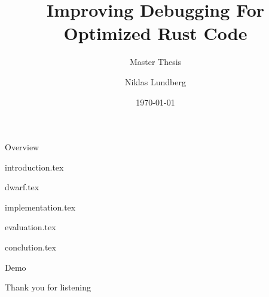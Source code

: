 \documentclass[aspectratio=169,xcolor=dvipsnames]{beamer}
\title[short title]{Improving Debugging For Optimized Rust Code}
\subtitle{Master Thesis}
\author[Niklas] {Niklas Lundberg}
\institute[LTU] %
{
    Department of Computer Science, Electrical and Space Engineering \\
    Luleå University of Technology
    \vskip 3pt
}
\date{\today} %
\begin{document}
\begin{frame}
    \titlepage
\end{frame}

\begin{frame}{Overview}
    \tableofcontents
\end{frame}



{introduction.tex}


{dwarf.tex}


{implementation.tex}


{evaluation.tex}


{conclution.tex}


\begin{frame}
    \Huge{\centerline{Demo}}
\end{frame}


\begin{frame}
    \Huge{\centerline{Thank you for listening}}
\end{frame}

\end{document}
